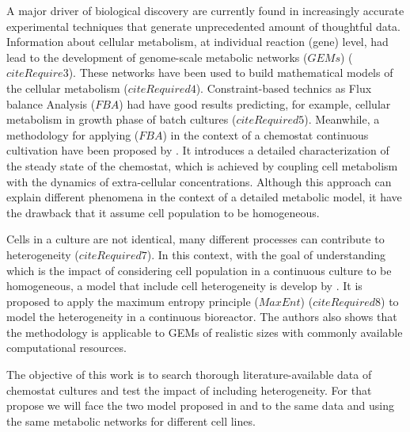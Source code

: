 \documentclass[]{article}
\begin{document}
	A major driver of biological discovery are currently found in increasingly accurate experimental techniques that generate unprecedented amount of thoughtful data. 
	Information about cellular metabolism, at individual reaction (gene) level, had lead to the development of genome-scale metabolic networks ($GEMs$) ($citeRequire3$). 
	These networks have been used to build mathematical models of the cellular metabolism ($citeRequired4$).
	Constraint-based technics as Flux balance Analysis ($FBA$) had have good results predicting, for example, cellular metabolism in growth phase of batch cultures ($citeRequired5$). 
	Meanwhile, a methodology for applying ($FBA$) in the context of a chemostat continuous cultivation have been proposed by . 
	It introduces a detailed characterization of the steady state of the chemostat, which is achieved by coupling cell metabolism with the dynamics of extra-cellular concentrations. 
	Although this approach can explain different phenomena in the context of a detailed metabolic model, it have the drawback that it assume cell population to be homogeneous.
	
	Cells in a culture are not identical, many different processes can contribute to heterogeneity ($citeRequired7$). 
	In this context, with the goal of understanding which is the impact of considering cell population in a continuous culture to be homogeneous, a model that include cell heterogeneity is develop by . 
	It is proposed to apply the maximum entropy principle ($MaxEnt$) ($citeRequired8$) to model the heterogeneity in a continuous bioreactor. 
	The authors also shows that the methodology is applicable to GEMs of realistic sizes with commonly available computational resources. 
	
	The objective of this work is to search thorough literature-available data of chemostat cultures and test the impact of including heterogeneity.
	For that propose we will face the two model proposed in  and  to the same data and using the same metabolic networks for different cell lines.
	
\end{document}
